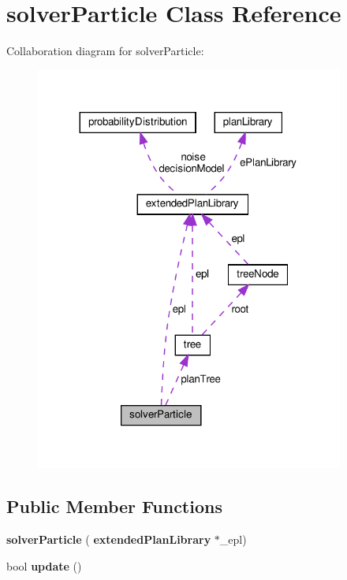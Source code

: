 \section{solver\+Particle Class Reference}
\label{classsolver_particle}


Collaboration diagram for solver\+Particle\+:
\nopagebreak
\begin{figure}[H]
\begin{center}
\leavevmode
\includegraphics[width=287pt]{classsolver_particle__coll__graph}
\end{center}
\end{figure}
\subsection*{Public Member Functions}
\begin{DoxyCompactItemize}
\item 
\mbox{\label{classsolver_particle_a1a94b951cf5e503cf20b7df7a59428b0}} 
{\bfseries solver\+Particle} (\textbf{ extended\+Plan\+Library} $\ast$\+\_\+epl)
\item 
\mbox{\label{classsolver_particle_a036aa885efb5c6c4dbfa7a6840d4a68b}} 
bool {\bfseries update} ()
\end{DoxyCompactItemize}
